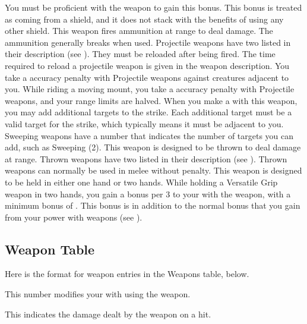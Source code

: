     You must be proficient with the weapon to gain this bonus.
    This bonus is treated as coming from a shield, and it does not stack with the benefits of using any other shield.
     This weapon fires ammunition at range to deal damage.
    The ammunition generally breaks when used.
    Projectile weapons have two  listed in their description (see ).
    They must be reloaded after being fired.
    The time required to reload a projectile weapon is given in the weapon description.
    You take a  accuracy penalty with Projectile weapons against creatures adjacent to you.
    While riding a moving mount, you take a  accuracy penalty with Projectile weapons, and your range limits are halved.
    \label{Sweeping} When you make a   with this weapon, you may add additional targets to the strike.
    Each additional target must be a valid target for the strike, which typically means it must be adjacent to you.
    Sweeping weapons have a number that indicates the number of targets you can add, such as Sweeping (2).
     This weapon is designed to be thrown to deal damage at range.
    Thrown weapons have two  listed in their description (see ).
    Thrown weapons can normally be used in melee without penalty.
     This weapon is designed to be held in either one hand or two hands.
    While holding a Versatile Grip weapon in two hands, you gain a  bonus per 3  to your  with the weapon, with a minimum bonus of .
    This bonus is in addition to the normal bonus that you gain from your power with weapons (see ).

  \subsection{Weapon Table}
    Here is the format for weapon entries in the Weapons table, below.

     This number modifies your  with  using the weapon.

     This  indicates the damage dealt by the weapon on a hit.

